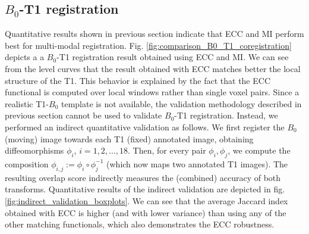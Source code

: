 \subsection{$B_{0}$-T1 registration}
Quantitative results shown in previous section indicate that ECC and MI perform best for multi-modal registration. Fig. \ref{fig:comparison_B0_T1_coregistration} depicts a a $B_{0}$-T1 registration result obtained using ECC and MI. We can see from the level curves that the result obtained with ECC matches better the local structure of the T1. This behavior is explained by the fact that the ECC functional is computed over local windows rather than single voxel pairs. Since a realistic T1-$B_{0}$ template is not available, the validation methodology described in previous section cannot be used to validate $B_{0}$-T1 registration. Instead, we performed an indirect quantitative validation as follows. We first register the $B_{0}$ (moving) image towards each T1 (fixed) annotated image, obtaining diffeomorphisms $\phi_{i}$, $i=1,2,...,18$. Then, for every pair $\phi_{i}, \phi_{j}$, we compute the composition $\phi_{i,j}:=\phi_{i}\circ \phi_{j}^{-1}$ (which now maps two annotated T1 images). The resulting overlap score indirectly measures the (combined) accuracy of both transforms. Quantitative results of the indirect validation are depicted in fig. \ref{fig:indirect_validation_boxplots}. We can see that the average Jaccard index obtained with ECC is higher (and with lower variance) than using any of the other matching functionals, which also demonstrates the ECC robustness.


